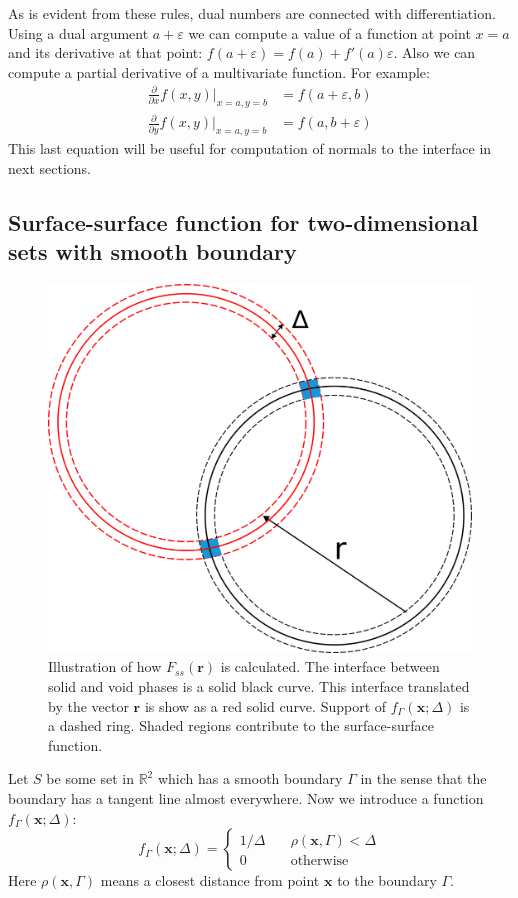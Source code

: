 \documentclass[reprint,amsmath,amssymb,aps,pre,showkeys,showpacs]{revtex4-1}
\begin{document}
As is evident from these rules, dual numbers are connected with differentiation. Using a dual
argument $a + \varepsilon$ we can compute a value of a function at point $x = a$
and its derivative at that point:
$f(a + \varepsilon) = f(a) + f'(a)\varepsilon$. Also we can compute a partial
derivative of a multivariate function. For example:
\begin{equation}
  \begin{aligned}
    \frac{\partial}{\partial x} f(x, y) \vert_{x = a, y = b} &= f(a + \varepsilon,
    b) \\
    \frac{\partial}{\partial y} f(x, y) \vert_{x = a, y = b} &= f(a, b +
    \varepsilon)
  \end{aligned}
  \label{eq:autonormals}
\end{equation}
This last equation will be useful for computation of normals to the interface in
next sections.

\subsection{Surface-surface function for two-dimensional sets with smooth boundary}
\label{sec:fss-2d}
\begin{figure}
  \centering
  \includegraphics[width=0.8\linewidth]{images/Fss.png}
  \caption[]{Illustration of how $F_{ss}(\bm{r})$ is calculated. The interface
    between solid and void phases is a solid black curve. This interface
    translated by the vector $\bm{r}$ is show as a red solid curve. Support of
    $f_\Gamma(\bm{x}; \Delta)$ is a dashed ring. Shaded regions contribute to
    the surface-surface function.}
  \label{fig:Fss-explained}
\end{figure}
Let $S$ be some set in $\mathbb{R}^2$ which has a smooth boundary $\Gamma$ in
the sense that the boundary has a tangent line almost everywhere. Now we
introduce a function $f_\Gamma(\bm{x}; \Delta)$:
\begin{equation}
  f_\Gamma(\bm{x}; \Delta) = \left\{
  \begin{array}{ll}
    1/\Delta & \quad \rho(\bm{x}, \Gamma) < \Delta \\
    0 & \quad \text{otherwise}
  \end{array}
  \right. \label{eq:delta-sequence}
\end{equation}
Here $\rho(\bm{x}, \Gamma)$ means a closest distance from point $\bm{x}$ to the
boundary $\Gamma$.
\end{document}
